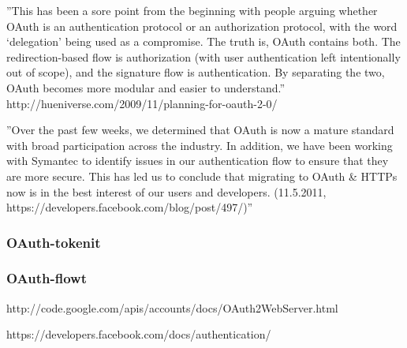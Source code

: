 \documentclass[finnish,gradu]{tktltiki}
\begin{document}
  ''This has been a sore point from the beginning with people arguing whether OAuth is an authentication protocol or an authorization protocol, with the word ‘delegation’ being used as a compromise. The truth is, OAuth contains both. The redirection-based flow is authorization (with user authentication left intentionally out of scope), and the signature flow is authentication. By separating the two, OAuth becomes more modular and easier to understand.'' http://hueniverse.com/2009/11/planning-for-oauth-2-0/

  ''Over the past few weeks, we determined that OAuth is now a mature standard with broad participation across the industry. In addition, we have been working with Symantec to identify issues in our authentication flow to ensure that they are more secure. This has led us to conclude that migrating to OAuth \& HTTPs now is in the best interest of our users and developers. (11.5.2011, https://developers.facebook.com/blog/post/497/)''


  \subsubsection{OAuth-tokenit} %
  \label{ssub:oauth_tokenit}


  \subsubsection{OAuth-flowt} %
  \label{ssub:oauth_flowt}
  http://code.google.com/apis/accounts/docs/OAuth2WebServer.html

  https://developers.facebook.com/docs/authentication/




\end{document}
